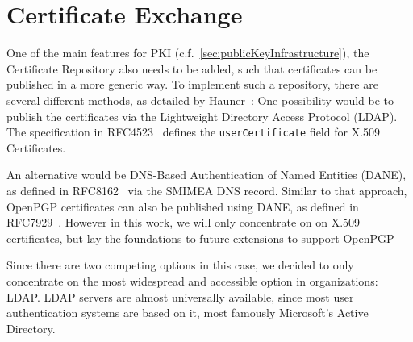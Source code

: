 \section{Certificate Exchange}\label{sec:certificateExchange}
One of the main features for PKI (c.f.~\ref{sec:publicKeyInfrastructure}), the Certificate Repository also needs to be
added, such that certificates can be published in a more generic way.
To implement such a repository, there are several different methods, as detailed by
Hauner~\cite{hauner2016interoperability}:
One possibility would be to publish the certificates via the Lightweight Directory Access Protocol (LDAP).
The specification in RFC4523~\cite{RFC4523} defines the \lstinline{userCertificate} field for X.509 Certificates.

An alternative would be DNS-Based Authentication of Named Entities (DANE), as defined in RFC8162~\cite{RFC8162} via the
SMIMEA DNS record.
Similar to that approach, OpenPGP certificates can also be published using DANE, as defined in RFC7929~\cite{RFC7929}.
However in this work, we will only concentrate on on X.509 certificates, but lay the foundations to future extensions
to support OpenPGP

Since there are two competing options in this case, we decided to only concentrate on the most widespread and accessible
option in organizations: LDAP\@.
LDAP servers are almost universally available, since most user authentication systems are based on it, most famously
Microsoft's Active Directory.
